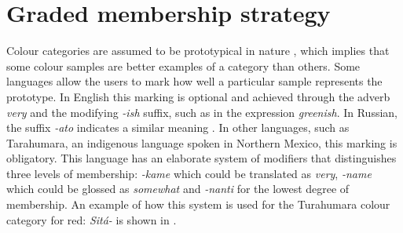 \chapter{Graded membership strategy}
\label{s:graded-membership-strategy}

Colour categories are assumed to be prototypical in nature
\citep{rosch73natural}, which implies that some colour samples are
better examples of a category than others. Some languages allow the
users to mark how well a particular sample represents the
prototype. In English this marking is optional and achieved through
the adverb \textit{very} and the modifying \textit{-ish} suffix, such as in the
expression \textit{greenish}. In Russian, the suffix \textit{-ato} indicates a
similar meaning \citep{safuanova07russian}. In other languages, such
as Tarahumara, an indigenous language spoken in Northern Mexico, this
marking is obligatory. This language has an elaborate system of
modifiers that distinguishes three levels of membership: \textit{-kame}
which could be translated as \textit{very}, \textit{-name} which could be
glossed as \textit{somewhat} and \textit{-nanti} for the lowest degree of
membership. An example of how this system is used for the Turahumara
colour category for red: \textit{Sit\'a-} is shown in  \citep{burgress83tarahumara}.

